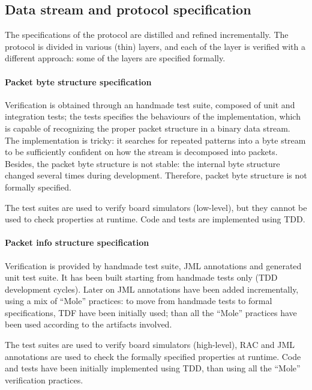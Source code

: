 \documentclass{article}
\begin{document}
\subsection{Data stream and protocol specification}
\label{subsec:data_stream_and_protocol_specification}

The specifications of the protocol are distilled and refined incrementally.
The protocol is divided in various (thin) layers, and each of the layer is verified with a different approach: some of the layers are specified formally. 

\paragraph*{Packet byte structure specification}

Verification is obtained through an handmade test suite, composed of unit and integration tests; the tests specifies the behaviours of the implementation, which is capable of recognizing the proper packet structure in a binary data stream. 
The implementation is tricky: it searches for repeated patterns into a byte stream to be sufficiently confident on how the stream is decomposed into packets.
Besides, the packet byte structure is not stable: the internal byte structure changed several times during development.
Therefore, packet byte structure is not formally specified.

The test suites are used to verify board simulators (low-level), but they cannot be used to check properties at runtime.
Code and tests are implemented using TDD.

\paragraph*{Packet info structure specification}

Verification is provided by handmade test suite, JML annotations and generated unit test suite. 
It has been built starting from handmade tests only (TDD development cycles).
Later on JML annotations have been added incrementally, using a mix of ``Mole'' practices: to move from handmade tests to formal specifications, TDF have been initially used; than all the ``Mole'' practices have been used according to the artifacts involved.

The test suites are used to verify board simulators (high-level), RAC and JML annotations are used to check the formally specified properties at runtime.
Code and tests have been initially implemented using TDD, than using all the ``Mole'' verification practices.
\end{document}
